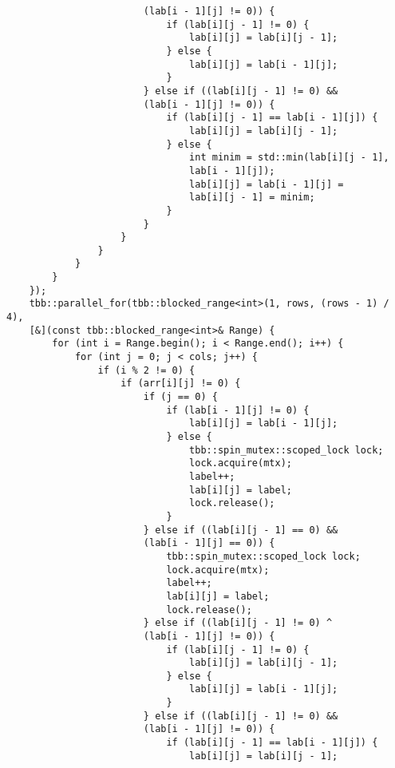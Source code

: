 \documentclass{report}
\begin{document}
\begin{lstlisting}
                        (lab[i - 1][j] != 0)) {
                            if (lab[i][j - 1] != 0) {
                                lab[i][j] = lab[i][j - 1];
                            } else {
                                lab[i][j] = lab[i - 1][j];
                            }
                        } else if ((lab[i][j - 1] != 0) &&
                        (lab[i - 1][j] != 0)) {
                            if (lab[i][j - 1] == lab[i - 1][j]) {
                                lab[i][j] = lab[i][j - 1];
                            } else {
                                int minim = std::min(lab[i][j - 1],
                                lab[i - 1][j]);
                                lab[i][j] = lab[i - 1][j] =
                                lab[i][j - 1] = minim;
                            }
                        }
                    }
                }
            }
        }
    });
    tbb::parallel_for(tbb::blocked_range<int>(1, rows, (rows - 1) / 4),
    [&](const tbb::blocked_range<int>& Range) {
        for (int i = Range.begin(); i < Range.end(); i++) {
            for (int j = 0; j < cols; j++) {
                if (i % 2 != 0) {
                    if (arr[i][j] != 0) {
                        if (j == 0) {
                            if (lab[i - 1][j] != 0) {
                                lab[i][j] = lab[i - 1][j];
                            } else {
                                tbb::spin_mutex::scoped_lock lock;
                                lock.acquire(mtx);
                                label++;
                                lab[i][j] = label;
                                lock.release();
                            }
                        } else if ((lab[i][j - 1] == 0) &&
                        (lab[i - 1][j] == 0)) {
                            tbb::spin_mutex::scoped_lock lock;
                            lock.acquire(mtx);
                            label++;
                            lab[i][j] = label;
                            lock.release();
                        } else if ((lab[i][j - 1] != 0) ^
                        (lab[i - 1][j] != 0)) {
                            if (lab[i][j - 1] != 0) {
                                lab[i][j] = lab[i][j - 1];
                            } else {
                                lab[i][j] = lab[i - 1][j];
                            }
                        } else if ((lab[i][j - 1] != 0) &&
                        (lab[i - 1][j] != 0)) {
                            if (lab[i][j - 1] == lab[i - 1][j]) {
                                lab[i][j] = lab[i][j - 1];

\end{lstlisting}
\end{document}

